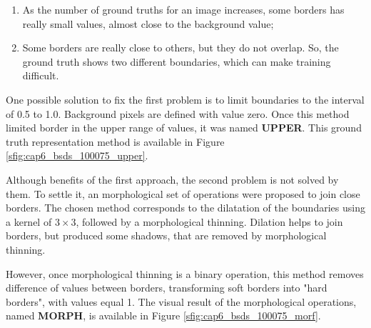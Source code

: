 \begin{enumerate}
    \item As the number of ground truths for an image increases, some borders has really small values, almost close to the background value;
    \item Some borders are really close to others, but they do not overlap. So, the ground truth shows two different boundaries, which can make training difficult.
\end{enumerate}

One possible solution to fix the first problem is to limit boundaries to the interval of 0.5 to 1.0.
Background pixels are defined with value zero.
Once this method limited border in the upper range of values, it was named \textbf{UPPER}.
This ground truth representation method is available in Figure \ref{sfig:cap6_bsds_100075_upper}.


Although benefits of the first approach, the second problem is not solved by them.
To settle it, an morphological set of operations were proposed to join close borders.
The chosen method corresponds to the dilatation of the boundaries using a kernel of $3 \times 3$, followed by a morphological thinning.
Dilation helps to join borders, but produced some shadows, that are removed by morphological thinning.

However, once morphological thinning is a binary operation, this method removes difference of values between borders, transforming soft borders into "hard borders", with values equal 1. 
The visual result of the morphological operations, named \textbf{MORPH}, is available in Figure \ref{sfig:cap6_bsds_100075_morf}.


